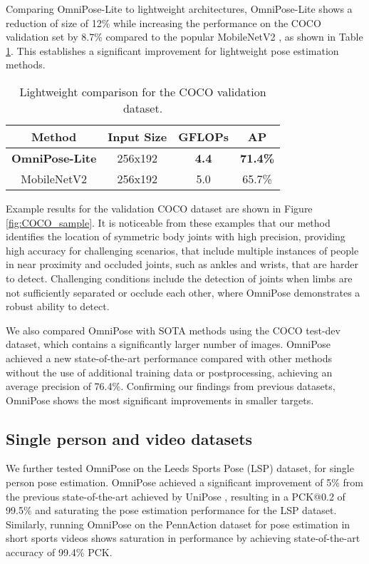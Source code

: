 \documentclass[10pt,twocolumn,letterpaper]{article}
\begin{document}
Comparing OmniPose-Lite to lightweight architectures, OmniPose-Lite shows a reduction of size of 12\% while increasing the performance on the COCO validation set by 8.7\% compared to the popular MobileNetV2 \cite{MobileNet}, as shown in Table \ref{tab:COCO_Mobile}. This establishes a significant improvement for lightweight pose estimation methods.

\begin{table}[!ht]
\begin{center}
\begin{tabular}{|c|c|c|c|}
\hline
Method&Input Size&GFLOPs&AP\\
\hline\hline
\textbf{OmniPose-Lite }&256x192&
\textbf{4.4}&\textbf{71.4\%}\\
MobileNetV2 \cite{MobileNet}&256x192&
5.0&65.7\%\\
\hline
\end{tabular}
\end{center}
\caption{Lightweight comparison for the COCO validation dataset.}
\label{tab:COCO_Mobile}
\end{table}

Example results for the validation COCO dataset are shown in Figure \ref{fig:COCO_sample}. 
It is  noticeable  from  these  examples  that  our method identifies the location of symmetric body joints with high precision, providing high accuracy for challenging scenarios, that include multiple instances of people in near proximity and occluded joints, such as ankles and wrists, that are harder to detect.
Challenging conditions include the detection of joints when limbs are not sufficiently separated or occlude each other, where OmniPose demonstrates a robust ability to detect.

We also compared OmniPose with SOTA methods using the COCO test-dev dataset, which contains a significantly larger number of images.
OmniPose achieved a new state-of-the-art performance compared with other methods without the use of additional training data or postprocessing, achieving an average precision of 76.4\%.
Confirming our findings from previous datasets, OmniPose shows the most significant improvements in smaller targets.

\subsection{Single person and video datasets}
We further tested OmniPose on the Leeds Sports Pose (LSP) \cite{LSP} dataset, for single person pose estimation. OmniPose achieved a significant improvement of 5\% from the previous state-of-the-art achieved by UniPose \cite{UniPose}, resulting in a PCK@0.2 of 99.5\% and saturating the pose estimation performance for the LSP dataset. Similarly, running OmniPose on the PennAction dataset for pose estimation in short sports videos \cite{PennAction} shows saturation in performance by achieving state-of-the-art accuracy of 99.4\% PCK.
\end{document}
